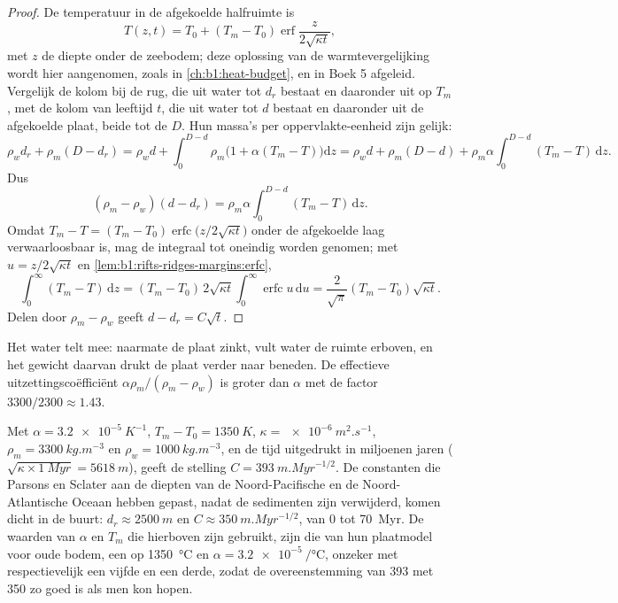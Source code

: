 \begin{proof}
De temperatuur in de afgekoelde halfruimte is
\[
  T(z, t) = T_0 + (T_m - T_0)\operatorname{erf}\frac{z}{2\sqrt{\kappa t}},
\]
met $z$ de diepte onder de zeebodem; deze oplossing van de warmtevergelijking wordt hier aangenomen, zoals in \cref{ch:b1:heat-budget}, en in Boek 5 afgeleid. Vergelijk de kolom bij de rug, die uit water tot $d_r$ bestaat en daaronder uit  op $T_m$, met de kolom van leeftijd $t$, die uit water tot $d$ bestaat en daaronder uit de afgekoelde plaat, beide tot de  $D$. Hun massa's per oppervlakte-eenheid zijn gelijk:
\[
  \rho_w d_r + \rho_m (D - d_r) = \rho_w d + \int_0^{D-d}\rho_m\bigl(1 + \alpha(T_m - T)\bigr)\mathrm dz
  = \rho_w d + \rho_m (D - d) + \rho_m\alpha\int_0^{D-d}(T_m - T)\,\mathrm dz.
\]
Dus
\[
  (\rho_m - \rho_w)(d - d_r) = \rho_m\alpha\int_0^{D-d}(T_m - T)\,\mathrm dz.
\]
Omdat $T_m - T = (T_m - T_0)\operatorname{erfc}\bigl(z/2\sqrt{\kappa t}\bigr)$ onder de afgekoelde laag verwaarloosbaar is, mag de integraal tot oneindig worden genomen; met $u = z/2\sqrt{\kappa t}$ en \cref{lem:b1:rifts-ridges-margins:erfc},
\[
  \int_0^\infty (T_m - T)\,\mathrm dz = (T_m - T_0)\,2\sqrt{\kappa t}\int_0^\infty\operatorname{erfc}u\,\mathrm du
  = \frac{2}{\sqrt\pi}(T_m - T_0)\sqrt{\kappa t}.
\]
Delen door $\rho_m - \rho_w$ geeft $d - d_r = C\sqrt t$.
\end{proof}

Het water telt mee: naarmate de plaat zinkt, vult water de ruimte erboven, en het gewicht daarvan drukt de plaat verder naar beneden. De effectieve uitzettingscoëfficiënt $\alpha\rho_m/(\rho_m - \rho_w)$ is groter dan $\alpha$ met de factor $3300/2300 \approx 1.43$.

Met $\alpha = \qty{3.2e-5}{K^{-1}}$, $T_m - T_0 = \qty{1350}{K}$, $\kappa = \qty{e-6}{m^2.s^{-1}}$, $\rho_m = \qty{3300}{kg.m^{-3}}$ en $\rho_w = \qty{1000}{kg.m^{-3}}$, en de tijd uitgedrukt in miljoenen jaren ($\sqrt{\kappa\times\qty{1}{Myr}} = \qty{5618}{m}$), geeft de stelling $C = \qty{393}{m.Myr^{-1/2}}$. De constanten die Parsons en Sclater aan de diepten van de Noord-Pacifische en de Noord-Atlantische Oceaan hebben gepast, nadat de sedimenten zijn verwijderd, komen dicht in de buurt: $d_r \approx \qty{2500}{m}$ en $C \approx \qty{350}{m.Myr^{-1/2}}$, van 0 tot \qty{70}{Myr}. De waarden van $\alpha$ en $T_m$ die hierboven zijn gebruikt, zijn die van hun plaatmodel voor oude bodem, een  op \qty{1350}{\degreeCelsius} en $\alpha = \qty{3.2e-5}{\per\degreeCelsius}$, onzeker met respectievelijk een vijfde en een derde, zodat de overeenstemming van 393 met 350 zo goed is als men kon hopen.

